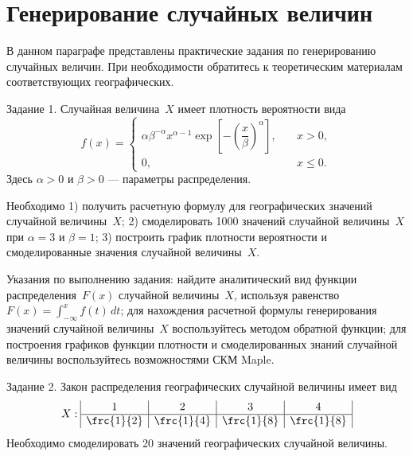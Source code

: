 \section{Генерирование случайных величин}

В данном параграфе представлены практические задания по генерированию случайных величин. При необходимости обратитесь к теоретическим  материалам соответствующих географических.

Задание 1. Случайная величина~$X$ имеет плотность вероятности вида
 $$
 f(x)=\left\{
 \begin{array}{ll}
 \alpha \beta^{-\alpha}x^{\alpha-1}\exp\left[-\left(
 \dfrac{x}{\beta}\right)^{\alpha}\right], & \quad x > 0,\\
 0, & \quad x \leqslant 0.
 \end{array}
 \right.
 $$
Здесь $\alpha >0$ и $\beta >0$ --- параметры распределения. 
 
Необходимо 1) получить расчетную формулу для географических значений случайной величины~$X$; 2) смоделировать 1000 значений случайной величины~$X$ при $\alpha=3$ и $\beta=1$; 3) построить график плотности вероятности и смоделированные значения случайной величины~$X$.       

Указания по выполнению задания: найдите аналитический вид функции распределения~$F(x)$ случайной величины~$X$, используя равенство  $F(x)=\int_{-\infty}^xf(t)\,dt$; для нахождения расчетной формулы генерирования значений случайной величины~$X$ воспользуйтесь методом обратной функции; для построения графиков функции плотности и смоделированных знаний случайной величины воспользуйтесь возможностями СКМ Maple.    

Задание 2. Закон распределения географических случайной величины имеет вид
$$
X:
\begin{array}{|c|c|c|c|}
1 & 2 & 3 & 4 \\
\hline \frc{1}{2} & \frc{1}{4} & \frc{1}{8} & \frc{1}{8}
\end{array}
$$
Необходимо смоделировать 20 значений географических случайной величины.
 

